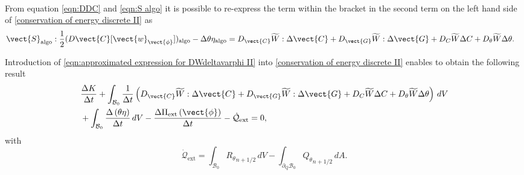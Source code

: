 {{\begin{equation}
\begin{aligned}
%
\end{aligned}
\end{equation}
%

From equation \eqref{eqn:DDC} and \eqref{eqn:S algo} it is possible to re-express the term within the bracket in the second term on the left hand side of \eqref{conservation of energy discrete II} as
%
\begin{equation}\label{eqn:approximated expression for DWdeltavarphi II}
\begin{aligned}
\vect{S}_{\text{algo}}:\frac{1}{2}(D\vect{C}[\vect{w}_{\vect{\phi}}])_{\text{algo}} - {\Delta \theta}\eta_{\text{algo}}&=
%
D_{\vect{C}}\widetilde{W}:\Delta\vect{C} + 
D_{\vect{G}}\widetilde{W}:\Delta\vect{G} + 
D_{C}\widetilde{W}\Delta C  + D_{\theta}\widetilde{W}\Delta\theta
%
.
%
\end{aligned}
\end{equation}
%

Introduction of \eqref{eqn:approximated expression for DWdeltavarphi II} into \eqref{conservation of energy discrete II} enables to obtain the following result
%
\begin{equation}\label{conservation of energy discrete III}
\begin{aligned}
&\frac{\Delta K}{\Delta t} + \int_{\mathcal{B}_0}\frac{1}{{\Delta t}}\left(D_{\vect{C}}\widetilde{W}:\Delta\vect{C} + D_{\vect{G}}\widetilde{W}:\Delta\vect{G} + D_C\widetilde{W}\Delta C + D_{\theta}\widetilde{W}\Delta\theta\right)\,dV
%
\\
%
&+\int_{\mathcal{B}_0}\frac{\Delta\left(\theta\eta\right)}{\Delta t}\,dV- \frac{\Delta\Pi_{\text{ext}}\left(\vect{\phi}\right)}{\Delta t} - \dot{\mathcal{Q}}_{\text{ext}}= 0,
%
\end{aligned}
\end{equation}
with
%
\begin{equation}\label{eqn:Qext}
\dot{\mathcal{Q}}_{\text{ext}}=\int_{\mathcal{B}_0}{R_{\theta}}_{n+1/2}\,dV - \int_{\partial_{Q}\mathcal{B}_{0}}{Q_{\theta}}_{n+1/2}\,dA.
\end{equation}

}}
